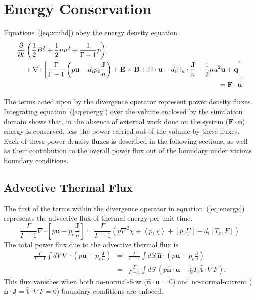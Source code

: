 \documentclass[letterpaper]{book}
\newcommand{\ddt}[1]{\frac{\partial #1}{\partial t}}
\renewcommand{\vec}[1]{\ensuremath{\mathbf{#1}}}
\newcommand{\tensor}[1]{\mathsf{#1}}
\newcommand{\B}{\vec{B}}
\newcommand{\E}{\vec{E}}
\renewcommand{\u}{\vec{u}}
\newcommand{\F}{\vec{F}}
\renewcommand{\j}{\vec{J}}
\newcommand{\q}{\vec{q}}
\newcommand{\jn}{\frac{\j}{n}}
\renewcommand{\P}{\tensor{\Pi}}
\newcommand{\grad}[1]{\nabla #1}
\renewcommand{\div}[1]{\nabla \cdot #1}
\newcommand{\lp}[1]{\nabla^2 #1}
\newcommand{\pb}[2]{\left[#1,#2\right]}
\newcommand{\ip}[2]{\left\langle  #1,#2\right\rangle}
\newcommand{\uvec}[1]{\ensuremath{\vec{\hat{#1}}}}
\begin{document}
\section{Energy Conservation}

Equations~(\ref{eq:xmhd}) obey the energy density equation
\begin{eqnarray}
 \lefteqn{\ddt{}\left(\frac{1}{2}B^2 + \frac{1}{2}n u^2 + \frac{1}{\Gamma-1}p
  \right)} \nonumber \\ & & \mbox{}+ \div{\left[
      \frac{\Gamma}{\Gamma-1} \left(p \u - d_i p_e \jn\right)
      + \E \times \B + \P \cdot \u - d_i \P_e \cdot \jn
      + \frac{1}{2} n u^2 \u + \q \right]} \nonumber
 \\ & & = \F \cdot \u \label{eq:energy}
\end{eqnarray}

The terms acted upon by the divergence operator represent power
density fluxes.  Integrating equation~(\ref{eq:energy}) over the
volume enclosed by the simulation domain shows that, in the absence of
external work done on the system ($\F \cdot \u$), energy is conserved,
less the power carried out of the volume by these fluxes.  Each of
these power density fluxes is described in the following sections, as
well as their contribution to the overall power flux out of the
boundary under various boundary conditions.

\subsection{Advective Thermal Flux}

The first of the terms within the divergence operator in
equation~(\ref{eq:energy}) represents the advective flux of thermal
energy per unit time.
\begin{equation}
  \frac{\Gamma}{\Gamma - 1} \div \left[ p \u - p_e \frac{\j}{n}
  \right] = \frac{\Gamma}{\Gamma - 1} \left( 
  p \lp\chi + \ip{p}{\chi} + \pb{p}{U} - d_i \pb{T_e}{F} \right)
\end{equation}
The total power flux due to the advective thermal flux is
\begin{eqnarray*}
  \frac{\Gamma}{\Gamma - 1} \int dV\ \div 
  \left( p \u - p_e \frac{\j}{n} \right) 
  & = & \frac{\Gamma}{\Gamma - 1} \int dS\ \uvec{n} \cdot
  \left( p \u - p_e \frac{\j}{n} \right) \\ 
  & = & \frac{\Gamma}{\Gamma - 1} \int dS\ 
  \left( p \uvec{n} \cdot \u - \frac{1}{R} T_e \uvec{t}\cdot \grad F \right).
\end{eqnarray*}
This flux vanishes when both no-normal-flow ($\uvec{n} \cdot \u =
0$) and no-normal-current ($\uvec{n} \cdot \j = \uvec{t} \cdot \grad F
= 0$) boundary conditions are enfoced.
\end{document}
